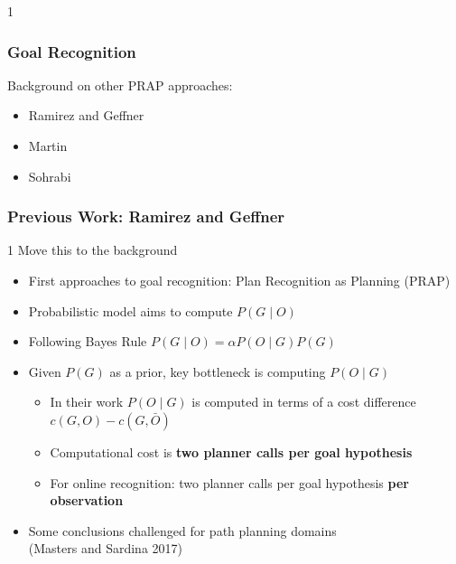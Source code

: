 \documentclass{beamer}
\newcommand{\todo}[1]{ {\color{red} #1} }
\def\masterclass{1}
\begin{document}
\if\masterclass1
	\begin{frame}[c]\frametitle{Goal Recognition}
		Background on other PRAP approaches:
		\begin{itemize}
			\item Ramirez and Geffner
			\item Martin
			\item Sohrabi
		\end{itemize}
	\end{frame}
	\begin{frame}[c]\frametitle{Previous Work: Ramirez and Geffner}
		\if\masterclass1
		\todo{Move this to the background}
		\fi
		\begin{itemize}
			\item First approaches to goal recognition: Plan Recognition as Planning (PRAP)
			\item Probabilistic model aims to compute $P(G \mid O)$
			\item Following Bayes Rule $P(G \mid O) = \alpha P(O \mid G) P(G)$
			\item Given $P(G)$ as a prior, key bottleneck is computing $P(O \mid G)$
			\begin{itemize}
				\item In their work $P(O \mid G)$ is computed in terms of a cost difference $c(G,O) - c(G,\bar{O})$
				\item Computational cost is \textbf{two planner calls per goal hypothesis}
				\item For online recognition: two planner calls per goal hypothesis \textbf{per observation}
			\end{itemize}
			\item Some conclusions challenged for path planning domains\\ (Masters and Sardina 2017)
		\end{itemize}
	\end{frame}
\fi
	
\end{document}
